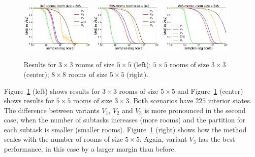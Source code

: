 \begin{figure}[!htb]
\centering
\includegraphics[width=0.32\textwidth]{figures/chapter1/nroom_3_3.png}
\includegraphics[width=0.32\textwidth]{figures/chapter1/nroom_5_5.png}
\includegraphics[width=0.32\textwidth]{figures/chapter1/nroom_8_8.png}\\
\caption{ Results for $3\times 3$ rooms of size $5 \times 5$ (left);
$5\times 5$ rooms of size $3 \times 3$ (center); $8 \times 8$ rooms of size $5\times 5$ (right).}
\label{fig:errors_grid}
\end{figure}

Figure~\ref{fig:errors_grid} (left) shows results for $3\times 3$ rooms of size $5\times 5$ and Figure~\ref{fig:errors_grid} (center) shows results for $5\times 5$ rooms of size $3\times 3$. Both scenarios have $225$ interior states.
The difference between variants $V_1$, $V_2$ and $V_3$ is more pronounced in the second case, when the number of subtasks increases (more rooms) and the partition for each subtask is smaller (smaller rooms). Figure~\ref{fig:errors_grid} (right) shows how the method scales with the number of rooms of size $5\times 5$.
Again, variant $V_3$ has the best performance, in this case by a larger 
margin than before.




